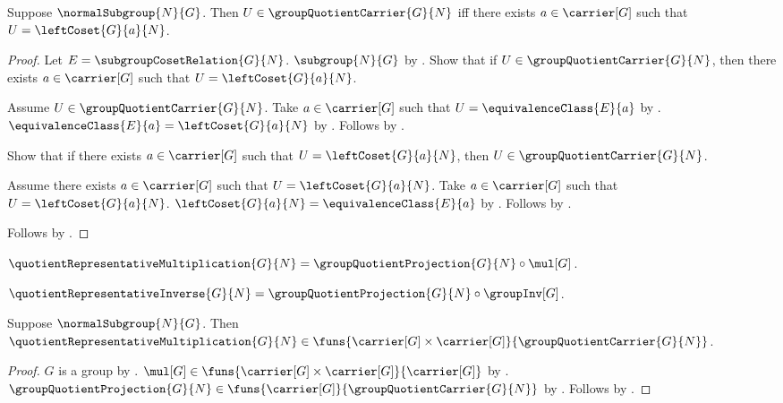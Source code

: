 \begin{proposition}\label{group_quotient_carrier_iff_left_coset}
    Suppose $\normalSubgroup{N}{G}$.
    Then $U\in\groupQuotientCarrier{G}{N}$ iff
        there exists $a\in\carrier[G]$ such that
            $U=\leftCoset{G}{a}{N}$.
\end{proposition}
\begin{proof}
    Let $E=\subgroupCosetRelation{G}{N}$.
    $\subgroup{N}{G}$ by .
    Show that if $U\in\groupQuotientCarrier{G}{N}$, then
        there exists $a\in\carrier[G]$ such that
            $U=\leftCoset{G}{a}{N}$.
    \begin{subproof}
        Assume $U\in\groupQuotientCarrier{G}{N}$.
        Take $a\in\carrier[G]$ such that
            $U=\equivalenceClass{E}{a}$ by
            .
        $\equivalenceClass{E}{a}=\leftCoset{G}{a}{N}$ by
            .
        Follows by \auto.
    \end{subproof}
    Show that if there exists $a\in\carrier[G]$ such that
        $U=\leftCoset{G}{a}{N}$, then
        $U\in\groupQuotientCarrier{G}{N}$.
    \begin{subproof}
        Assume there exists $a\in\carrier[G]$ such that
            $U=\leftCoset{G}{a}{N}$.
        Take $a\in\carrier[G]$ such that
            $U=\leftCoset{G}{a}{N}$.
        $\leftCoset{G}{a}{N}=\equivalenceClass{E}{a}$ by
            .
        Follows by .
    \end{subproof}
    Follows by \auto.
\end{proof}

\begin{definition}\label{quotient_representative_multiplication}
    $\quotientRepresentativeMultiplication{G}{N}=
        \groupQuotientProjection{G}{N}\circ\mul[G]$.
\end{definition}

\begin{definition}\label{quotient_representative_inverse}
    $\quotientRepresentativeInverse{G}{N}=
        \groupQuotientProjection{G}{N}\circ\groupInv[G]$.
\end{definition}

\begin{proposition}\label{quotient_representative_multiplication_type}
    Suppose $\normalSubgroup{N}{G}$.
    Then $\quotientRepresentativeMultiplication{G}{N}\in
        \funs{
            \carrier[G]\times\carrier[G]}
            {\groupQuotientCarrier{G}{N}}$.
\end{proposition}
\begin{proof}
    $G$ is a group by .
    $\mul[G]\in
        \funs{\carrier[G]\times\carrier[G]}{\carrier[G]}$ by
        .
    $\groupQuotientProjection{G}{N}\in
        \funs{\carrier[G]}{\groupQuotientCarrier{G}{N}}$ by
        .
    Follows by .
\end{proof}

